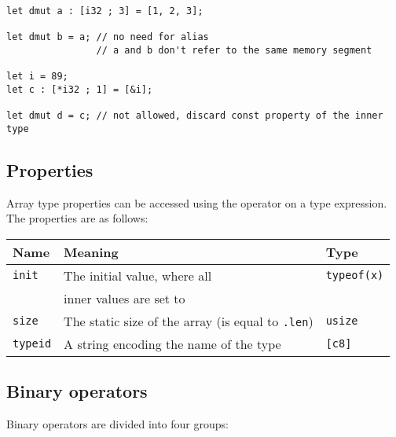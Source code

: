 \begin{lstlisting}[style=coloredverbatim]
let dmut a : [i32 ; 3] = [1, 2, 3];

let dmut b = a; // no need for alias
                // a and b don't refer to the same memory segment

let i = 89;
let c : [*i32 ; 1] = [&i];

let dmut d = c; // not allowed, discard const property of the inner type
\end{lstlisting}



\subsection {Properties}

Array type properties can be accessed using the \token{::} operator on a type
expression. The properties are as follows:

\begin{center}\begin{adjustbox}{max width=\linewidth}
  \begin{tabular}{|l|ll|}
    \hline
    Name & Meaning & Type\\
    \hline
    \hline
    \texttt{init} & The initial value, where all & \texttt{typeof(x)} \\
    & inner values are set to  & \\
    \Xhline{0.001pt}
    \texttt{size} & The static size of the array (is equal to \texttt{.len}) & \texttt{usize} \\
    \hline
    \texttt{typeid} & A string encoding the name of the type & \texttt{[c8]} \\
    \hline
  \end{tabular}
\end{adjustbox}\end{center}

\subsection {Binary operators}

Binary operators are divided into four groups:

